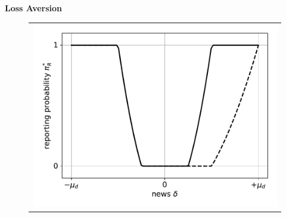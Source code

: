 \documentclass{article}
\begin{document}
\pagebreak
\begin{center}
	\textbf{Loss Aversion}
\end{center}
\begin{figure}[h]
	\begin{center}
		\begin{tabular}{c}
			\includegraphics[scale=.5]{news_reporting_probability_reporting_probability} 
		\end{tabular}
	\end{center}
\end{figure}
\end{document}
